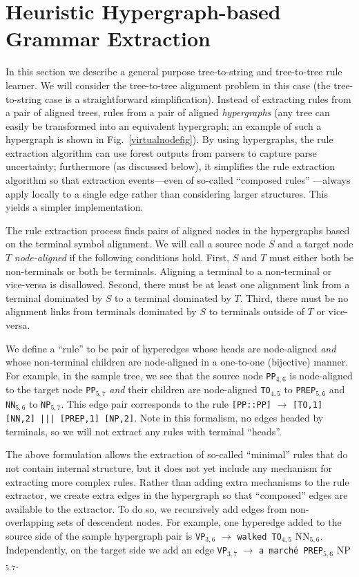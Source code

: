 \documentclass[nofonts]{pbml} %
\begin{document}
\section{Heuristic Hypergraph-based Grammar Extraction}
\label{sec:hypergrex}
In this section we describe a general purpose tree-to-string and tree-to-tree rule learner. We will consider the tree-to-tree alignment problem in this case (the tree-to-string case is a straightforward simplification).
Instead of extracting rules from a pair of aligned trees, rules from a pair of
aligned \emph{hypergraphs} (any tree can easily be transformed into an equivalent hypergraph; an example of such a hypergraph is shown in Fig.~\ref{virtualnodefig}). By using hypergraphs, the rule extraction algorithm can use forest outputs from parsers to capture parse uncertainty; furthermore (as discussed below), it simplifies the rule extraction algorithm so that extraction events---even of so-called ``composed rules'' \citep{galley:2006}---always apply locally to a single edge rather than considering larger structures. This yields a simpler implementation.

The rule extraction process finds pairs of aligned nodes in the hypergraphs based on the terminal symbol alignment.
We will call a source node $S$ and a target node $T$ \emph{node-aligned} if the following conditions hold.
First, $S$ and $T$ must either both be non-terminals or both be terminals.
Aligning a terminal to a non-terminal or vice-versa is disallowed.
Second, there must be at least one alignment link from a terminal dominated by $S$ to a terminal dominated by $T$.
Third, there must be no alignment links from terminals dominated by $S$ to terminals outside of $T$ or vice-versa.

We define a ``rule'' to be pair of hyperedges whose heads are node-aligned
\emph{and} whose non-terminal children are node-aligned in a one-to-one (bijective) manner.
For example, in the sample tree, we see that the source node \texttt{PP}$_{4,6}$ is
node-aligned to the target node \texttt{PP}$_{5,7}$ \emph{and} their children are node-aligned \texttt{TO}$_{4,5}$ to \texttt{PREP}$_{5,6}$ and \texttt{NN}$_{5,6}$ to \texttt{NP}$_{5,7}$.
This edge pair corresponds to the rule \texttt{[PP::PP]} $\rightarrow$ \texttt{[TO,1] [NN,2] ||| [PREP,1] [NP,2]}.
Note in this formalism, no edges headed by terminals, so we will not extract any rules with terminal ``heads''.

The above formulation allows the extraction of so-called ``minimal'' rules that do not contain internal structure, but it does not yet
include any mechanism for extracting more complex rules. Rather than adding extra mechanisms to the rule extractor, we create extra edges in the hypergraph so that ``composed'' edges are available to the extractor. To do so, we recursively add edges from non-overlapping sets
of descendent nodes. For example, one hyperedge added to the source side of the sample hypergraph pair is
\texttt{VP}$_{3,6}$ $\rightarrow$ \texttt{walked TO}$_{4,5}$ NN$_{5,6}$. Independently, on the target side we add an edge
\texttt{VP}$_{3,7}$ $\rightarrow$ \texttt{a march\'{e} PREP}$_{5,6}$ NP$_{5,7}$.
\end{document}
